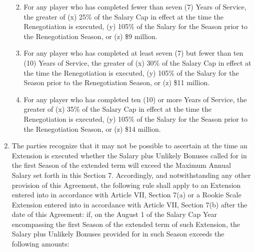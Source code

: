 \documentclass[
]{book}
\providecommand{\tightlist}{%
  \setlength{\itemsep}{0pt}\setlength{\parskip}{0pt}}
\begin{document}
\begin{enumerate}
  \begin{enumerate}
  \def\labelenumii{(\roman{enumii})}
  \tightlist
  \item
    For any player who has completed fewer than seven (7) Years of Service, the greater of (x) 25\% of the Salary Cap in effect at the time the Renegotiation is executed, (y) 105\% of the Salary for the Season prior to the Renegotiation Season, or (z) \$9 million.
  \item
    For any player who has completed at least seven (7) but fewer than ten (10) Years of Service, the greater of (x) 30\% of the Salary Cap in effect at the time the Renegotiation is executed, (y) 105\% of the Salary for the Season prior to the Renegotiation Season, or (z) \$11 million.
  \item
    For any player who has completed ten (10) or more Years of Service, the greater of (x) 35\% of the Salary Cap in effect at the time the Renegotiation is executed, (y) 105\% of the Salary for the Season prior to the Renegotiation Season, or (z) \$14 million.
  \end{enumerate}
\item
  The parties recognize that it may not be possible to ascertain at the time an Extension is executed whether the Salary plus Unlikely Bonuses called for in the first Season of the extended term will exceed the Maximum Annual Salary set forth in this Section 7. Accordingly, and notwithstanding any other provision of this Agreement, the following rule shall apply to an Extension entered into in accordance with Article VII, Section 7(a) or a Rookie Scale Extension entered into in accordance with Article VII, Section 7(b) after the date of this Agreement: if, on the August 1 of the Salary Cap Year encompassing the first Season of the extended term of such Extension, the Salary plus Unlikely Bonuses provided for in such Season exceeds the following amounts:


\end{enumerate}
\end{document}
